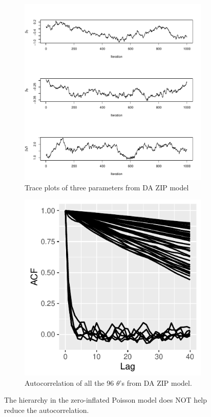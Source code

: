 \documentclass[10pt]{article}
\begin{document}
 \begin{figure}[H]
   \begin{subfigure}[b]{0.45\textwidth}
 \includegraphics[width=1\textwidth]{traceplot_poisson_zip_da.pdf}
 \caption{Trace plots of three parameters from DA ZIP model}
 \end{subfigure}
  \hfill 
 \begin{subfigure}[b]{0.45\textwidth}
 \includegraphics[width=1\textwidth]{poisson_zip_da_acf.pdf}
 \caption{Autocorrelation of all the 96 $\theta$'s from DA ZIP model.}
 \end{subfigure}  
 \caption{The hierarchy in the zero-inflated Poisson model does NOT help reduce the autocorrelation.}
 \end{figure}
\end{document}
